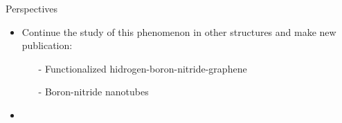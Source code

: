\documentclass{beamer}
\begin{document}
\begin{frame}

Perspectives
{\small

\begin{itemize}

\item 
Continue the study of this phenomenon in other structures and make new
publication:

\begin{itemize}
     \item[-] Functionalized hidrogen-boron-nitride-graphene
     \item[-] Boron-nitride nanotubes
\end{itemize} 

\item 

\end{itemize}
}

\end{frame}
\end{document}
